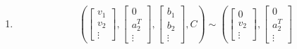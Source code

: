 \documentclass[11pt,letterpaper]{amsart}
\begin{document}
\begin{defin}
\begin{enumerate}
$$\begin{bmatrix}
    \end{bmatrix}, \begin{bmatrix}
        a_1^T \\ a_1^T \\ a_3^T\\ \vdots
    \end{bmatrix}, \begin{bmatrix}
        b_1 \\ b_1 \\ b_3\\ \vdots
    \end{bmatrix}, C\right) \sim \left(\begin{bmatrix}
        v_1 +v_2 \\ 0 \\ v_3 \\  \vdots
    \end{bmatrix}, \begin{bmatrix}
        a_1^T \\ a_1^T \\ a_3^T\\ \vdots
    \end{bmatrix}, \begin{bmatrix}
        b_1 \\ b_1 \\ b_3\\ \vdots
    \end{bmatrix}, C\right) 
    $$
        \item 
    $$
    \left(\begin{bmatrix}
        v_1 \\ v_2 \\  \vdots
    \end{bmatrix}, \begin{bmatrix}
        0 \\ a_2^T \\ \vdots
    \end{bmatrix}, \begin{bmatrix}
        b_1 \\ b_2 \\ \vdots
    \end{bmatrix}, C\right) \sim \left(\begin{bmatrix}
        0 \\ v_2 \\  \vdots
    \end{bmatrix}, \begin{bmatrix}
        0 \\ a_2^T \\ \vdots

\end{bmatrix}$$
\end{enumerate}
\end{defin}
\end{document}
